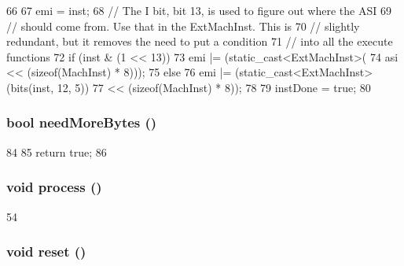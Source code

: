 \begin{DoxyCode}
66     {
67         emi = inst;
68         // The I bit, bit 13, is used to figure out where the ASI
69         // should come from. Use that in the ExtMachInst. This is
70         // slightly redundant, but it removes the need to put a condition
71         // into all the execute functions
72         if (inst & (1 << 13)) {
73             emi |= (static_cast<ExtMachInst>(
74                         asi << (sizeof(MachInst) * 8)));
75         } else {
76             emi |= (static_cast<ExtMachInst>(bits(inst, 12, 5))
77                     << (sizeof(MachInst) * 8));
78         }
79         instDone = true;
80     }
\end{DoxyCode}
\hypertarget{classSparcISA_1_1Decoder_a35631c47fc45b69ca30e6551f9f5d1d1}{
\subsubsection[{needMoreBytes}]{\setlength{\rightskip}{0pt plus 5cm}bool needMoreBytes ()}}
\label{classSparcISA_1_1Decoder_a35631c47fc45b69ca30e6551f9f5d1d1}



\begin{DoxyCode}
84     {
85         return true;
86     }
\end{DoxyCode}
\hypertarget{classSparcISA_1_1Decoder_a2e9c5136d19b1a95fc427e0852deab5c}{
\subsubsection[{process}]{\setlength{\rightskip}{0pt plus 5cm}void process ()}}
\label{classSparcISA_1_1Decoder_a2e9c5136d19b1a95fc427e0852deab5c}



\begin{DoxyCode}
54 {}
\end{DoxyCode}
\hypertarget{classSparcISA_1_1Decoder_ad20897c5c8bd47f5d4005989bead0e55}{
\subsubsection[{reset}]{\setlength{\rightskip}{0pt plus 5cm}void reset ()}}
\label{classSparcISA_1_1Decoder_ad20897c5c8bd47f5d4005989bead0e55}



